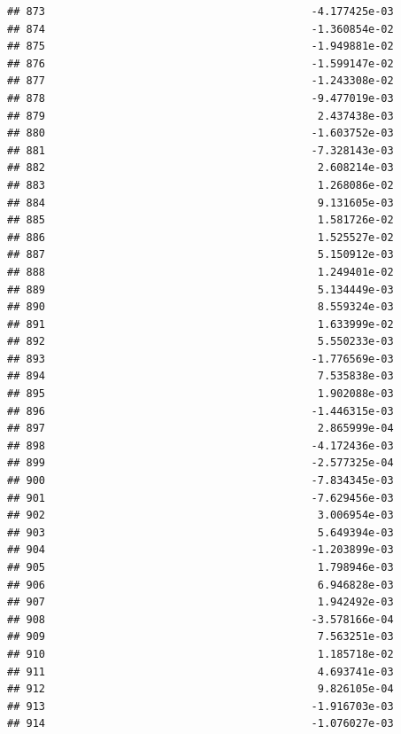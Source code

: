 \documentclass[
]{article}
\begin{document}
\begin{verbatim}
## 873                                          -4.177425e-03
## 874                                          -1.360854e-02
## 875                                          -1.949881e-02
## 876                                          -1.599147e-02
## 877                                          -1.243308e-02
## 878                                          -9.477019e-03
## 879                                           2.437438e-03
## 880                                          -1.603752e-03
## 881                                          -7.328143e-03
## 882                                           2.608214e-03
## 883                                           1.268086e-02
## 884                                           9.131605e-03
## 885                                           1.581726e-02
## 886                                           1.525527e-02
## 887                                           5.150912e-03
## 888                                           1.249401e-02
## 889                                           5.134449e-03
## 890                                           8.559324e-03
## 891                                           1.633999e-02
## 892                                           5.550233e-03
## 893                                          -1.776569e-03
## 894                                           7.535838e-03
## 895                                           1.902088e-03
## 896                                          -1.446315e-03
## 897                                           2.865999e-04
## 898                                          -4.172436e-03
## 899                                          -2.577325e-04
## 900                                          -7.834345e-03
## 901                                          -7.629456e-03
## 902                                           3.006954e-03
## 903                                           5.649394e-03
## 904                                          -1.203899e-03
## 905                                           1.798946e-03
## 906                                           6.946828e-03
## 907                                           1.942492e-03
## 908                                          -3.578166e-04
## 909                                           7.563251e-03
## 910                                           1.185718e-02
## 911                                           4.693741e-03
## 912                                           9.826105e-04
## 913                                          -1.916703e-03
## 914                                          -1.076027e-03

\end{verbatim}
\end{document}
